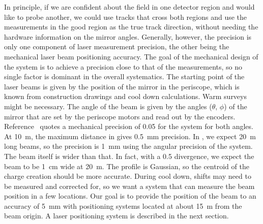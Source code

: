 In principle, if we are confident about the field in one detector region and would like to probe another, we could use tracks that cross both regions and use the  measurements in the good region as the true track direction, without needing the hardware information on the mirror angles. Generally, however, the  precision is only one component of laser measurement precision, the other being the mechanical laser beam positioning accuracy. The goal of the mechanical design of the system is to achieve a precision close to that of the  measurements, so no single factor is dominant in the overall systematics. The starting point of the laser beams is given by the position of the mirror in the periscope, which is known from construction drawings and cool down calculations. Warm surveys might be necessary. The angle of the beam is given by the angles ($\theta$, $\phi$) of the mirror that are set by the periscope motors and read out by the encoders. 
Reference~\cite{bib:chen2018} quotes a mechanical precision of \SI{0.05}{\mrad} for the  system for both angles. At \SI{10}{\m}, the maximum distance in  
gives \SI{0.5}{\milli\m} precision. In , we 
expect \SI{20}{\m} long beams, so the precision is \SI{1}{\milli\m} 
using the angular precision of the  system. The beam itself is wider than that. In fact, with a \SI{0.5}{\mrad} divergence, we expect the beam to be \SI{1}{\cm} wide at \SI{20}{\m}. The profile is Gaussian, so the centroid of the charge creation should be more accurate. During cool down, shifts may need to be measured and corrected for, so we want a system that can measure the beam position in a few locations. Our goal is to provide the position of the beam to an accuracy of \SI{5}{\milli\m} with positioning systems located at about \SI{15}{\m} from the beam origin. A laser positioning system is described in the next section.

 
 


